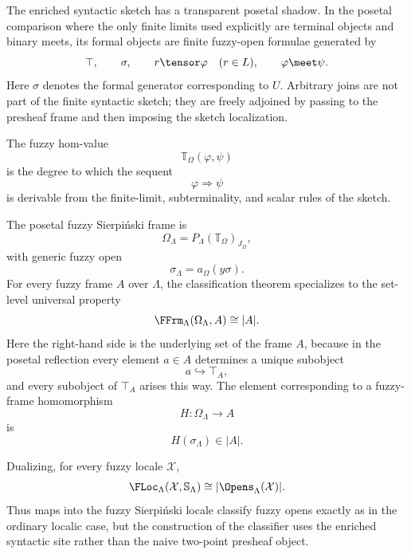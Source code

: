 The enriched syntactic sketch has a transparent posetal shadow. In the posetal
comparison where the only finite limits used explicitly are terminal objects and
binary meets, its formal objects are finite fuzzy-open formulae generated by
\[
    \top,
    \qquad
    \sigma,
    \qquad
    r\tensor\varphi \quad (r\in L),
    \qquad
    \varphi\meet\psi.
\]
Here \(\sigma\) denotes the formal generator corresponding to \(U\). Arbitrary joins
are not part of the finite syntactic sketch; they are freely adjoined by passing to
the presheaf frame and then imposing the sketch localization.

The fuzzy hom-value
\[
    \mathbb T_{\Omega}(\varphi,\psi)
\]
is the degree to which the sequent
\[
    \varphi\Rightarrow\psi
\]
is derivable from the finite-limit, subterminality, and scalar rules of the sketch.

The posetal fuzzy Sierpiński frame is
\[
    \Omega_\Lambda
    =
    P_\Lambda(\mathbb T_{\Omega})_{J_{\Omega}},
\]
with generic fuzzy open
\[
    \sigma_\Lambda
    =
    a_{\Omega}(y\sigma).
\]
For every fuzzy frame \(A\) over \(\Lambda\), the classification theorem specializes
to the set-level universal property
\[
    \FFrm_\Lambda(\Omega_\Lambda,A)
    \cong
    |A|.
\]
Here the right-hand side is the underlying set of the frame \(A\), because in the
posetal reflection every element \(a\in A\) determines a unique subobject
\[
    a\hookrightarrow \top_A,
\]
and every subobject of \(\top_A\) arises this way. The element corresponding to a
fuzzy-frame homomorphism
\[
    H:\Omega_\Lambda\to A
\]
is
\[
    H(\sigma_\Lambda)\in |A|.
\]

Dualizing, for every fuzzy locale \(\mathcal X\),
\[
    \FLoc_\Lambda(\mathcal X,\mathbb S_\Lambda)
    \cong
    |\Opens_\Lambda(\mathcal X)|.
\]
Thus maps into the fuzzy Sierpiński locale classify fuzzy opens exactly as in the
ordinary localic case, but the construction of the classifier uses the enriched
syntactic site rather than the naive two-point presheaf object.
